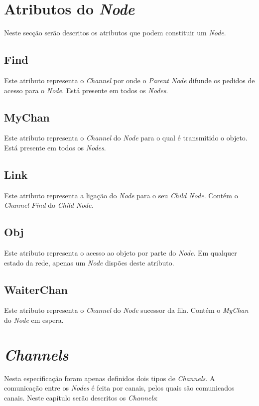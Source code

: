 \section{Atributos do \emph{Node}}
\label{especificacao:atr:section}
Neste secção serão descritos os atributos que podem constituir um \emph{Node}.

\subsection{Find}
\label{especificacao:atr:find}
    Este atributo representa o \emph{Channel} por onde o \emph{Parent Node} difunde os pedidos de acesso para o \emph{Node}.
    Está presente em todos os \emph{Nodes}.

\subsection{MyChan}
\label{especificacao:atr:mychan}
    Este atributo representa o \emph{Channel} do \emph{Node} para o qual é transmitido o objeto.
    Está presente em todos os \emph{Nodes}.

\subsection{Link}
\label{especificacao:atr:link}
    Este atributo representa a ligação do \emph{Node} para o seu \emph{Child Node}.
    Contém o \emph{Channel Find} do \emph{Child Node}.


\subsection{Obj}
\label{especificacao:atr:obj}
    Este atributo representa o acesso ao objeto por parte do \emph{Node}.
    Em qualquer estado da rede, apenas um \emph{Node} dispões deste atributo.

\subsection{WaiterChan}
\label{especificacao:atr:waiterchan}
    Este atributo representa o \emph{Channel} do \emph{Node} sucessor da fila.
    Contém o \emph{MyChan} do \emph{Node} em espera.


\section{\emph{Channels}}
\label{especificacao:sec:Channels}
Nesta especificação foram apenas definidos dois tipos de \emph{Channels}. A comunicação entre os \emph{Nodes} é feita por canais, pelos quais são comunicados canais.
Neste capítulo serão descritos os \emph{Channels}:


